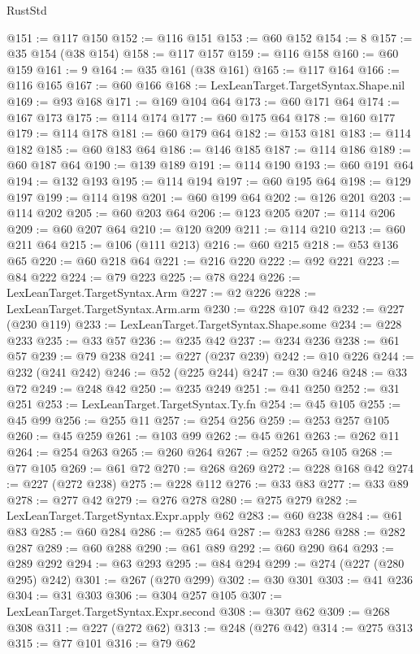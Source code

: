 \begin{lexlean}{RustStd}
\begin{coremodule}
@151 := @117 @150
@152 := @116 @151
@153 := @60 @152
@154 := 8
@157 := @35 @154 (@38 @154)
@158 := @117 @157
@159 := @116 @158
@160 := @60 @159
@161 := 9
@164 := @35 @161 (@38 @161)
@165 := @117 @164
@166 := @116 @165
@167 := @60 @166
@168 := LexLeanTarget.TargetSyntax.Shape.nil
@169 := @93 @168
@171 := @169 @104 @64
@173 := @60 @171 @64
@174 := @167 @173
@175 := @114 @174
@177 := @60 @175 @64
@178 := @160 @177
@179 := @114 @178
@181 := @60 @179 @64
@182 := @153 @181
@183 := @114 @182
@185 := @60 @183 @64
@186 := @146 @185
@187 := @114 @186
@189 := @60 @187 @64
@190 := @139 @189
@191 := @114 @190
@193 := @60 @191 @64
@194 := @132 @193
@195 := @114 @194
@197 := @60 @195 @64
@198 := @129 @197
@199 := @114 @198
@201 := @60 @199 @64
@202 := @126 @201
@203 := @114 @202
@205 := @60 @203 @64
@206 := @123 @205
@207 := @114 @206
@209 := @60 @207 @64
@210 := @120 @209
@211 := @114 @210
@213 := @60 @211 @64
@215 := @106 (@111 @213)
@216 := @60 @215
@218 := @53 @136 @65
@220 := @60 @218 @64
@221 := @216 @220
@222 := @92 @221
@223 := @84 @222
@224 := @79 @223
@225 := @78 @224
@226 := LexLeanTarget.TargetSyntax.Arm
@227 := @2 @226
@228 := LexLeanTarget.TargetSyntax.Arm.arm
@230 := @228 @107 @42
@232 := @227 (@230 @119)
@233 := LexLeanTarget.TargetSyntax.Shape.some
@234 := @228 @233
@235 := @33 @57
@236 := @235 @42
@237 := @234 @236
@238 := @61 @57
@239 := @79 @238
@241 := @227 (@237 @239)
@242 := @10 @226
@244 := @232 (@241 @242)
@246 := @52 (@225 @244)
@247 := @30 @246
@248 := @33 @72
@249 := @248 @42
@250 := @235 @249
@251 := @41 @250
@252 := @31 @251
@253 := LexLeanTarget.TargetSyntax.Ty.fn
@254 := @45 @105
@255 := @45 @99
@256 := @255 @11
@257 := @254 @256
@259 := @253 @257 @105
@260 := @45 @259
@261 := @103 @99
@262 := @45 @261
@263 := @262 @11
@264 := @254 @263
@265 := @260 @264
@267 := @252 @265 @105
@268 := @77 @105
@269 := @61 @72
@270 := @268 @269
@272 := @228 @168 @42
@274 := @227 (@272 @238)
@275 := @228 @112
@276 := @33 @83
@277 := @33 @89
@278 := @277 @42
@279 := @276 @278
@280 := @275 @279
@282 := LexLeanTarget.TargetSyntax.Expr.apply @62
@283 := @60 @238
@284 := @61 @83
@285 := @60 @284
@286 := @285 @64
@287 := @283 @286
@288 := @282 @287
@289 := @60 @288
@290 := @61 @89
@292 := @60 @290 @64
@293 := @289 @292
@294 := @63 @293
@295 := @84 @294
@299 := @274 (@227 (@280 @295) @242)
@301 := @267 (@270 @299)
@302 := @30 @301
@303 := @41 @236
@304 := @31 @303
@306 := @304 @257 @105
@307 := LexLeanTarget.TargetSyntax.Expr.second
@308 := @307 @62
@309 := @268 @308
@311 := @227 (@272 @62)
@313 := @248 (@276 @42)
@314 := @275 @313
@315 := @77 @101
@316 := @79 @62

\end{coremodule}
\end{lexlean}
